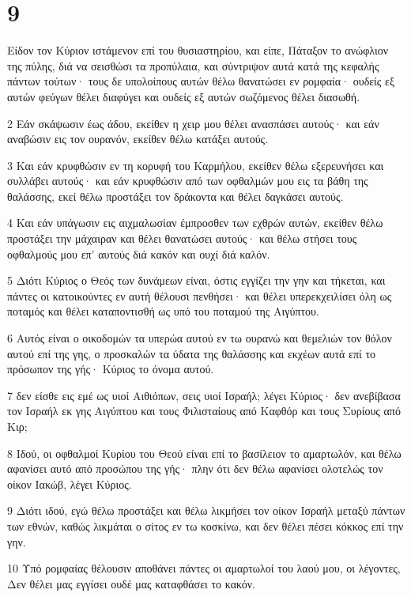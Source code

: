 \chapter{9}

\par Είδον τον Κύριον ιστάμενον επί του θυσιαστηρίου, και είπε, Πάταξον το ανώφλιον της πύλης, διά να σεισθώσι τα προπύλαια, και σύντριψον αυτά κατά της κεφαλής πάντων τούτων· τους δε υπολοίπους αυτών θέλω θανατώσει εν ρομφαία· ουδείς εξ αυτών φεύγων θέλει διαφύγει και ουδείς εξ αυτών σωζόμενος θέλει διασωθή.
\par 2 Εάν σκάψωσιν έως άδου, εκείθεν η χειρ μου θέλει ανασπάσει αυτούς· και εάν αναβώσιν εις τον ουρανόν, εκείθεν θέλω κατάξει αυτούς.
\par 3 Και εάν κρυφθώσιν εν τη κορυφή του Καρμήλου, εκείθεν θέλω εξερευνήσει και συλλάβει αυτούς· και εάν κρυφθώσιν από των οφθαλμών μου εις τα βάθη της θαλάσσης, εκεί θέλω προστάξει τον δράκοντα και θέλει δαγκάσει αυτούς.
\par 4 Και εάν υπάγωσιν εις αιχμαλωσίαν έμπροσθεν των εχθρών αυτών, εκείθεν θέλω προστάξει την μάχαιραν και θέλει θανατώσει αυτούς· και θέλω στήσει τους οφθαλμούς μου επ' αυτούς διά κακόν και ουχί διά καλόν.
\par 5 Διότι Κύριος ο Θεός των δυνάμεων είναι, όστις εγγίζει την γην και τήκεται, και πάντες οι κατοικούντες εν αυτή θέλουσι πενθήσει· και θέλει υπερεκχειλίσει όλη ως ποταμός και θέλει καταποντισθή ως υπό του ποταμού της Αιγύπτου.
\par 6 Αυτός είναι ο οικοδομών τα υπερώα αυτού εν τω ουρανώ και θεμελιών τον θόλον αυτού επί της γης, ο προσκαλών τα ύδατα της θαλάσσης και εκχέων αυτά επί το πρόσωπον της γής· Κύριος το όνομα αυτού.
\par 7 δεν είσθε εις εμέ ως υιοί Αιθιόπων, σεις υιοί Ισραήλ; λέγει Κύριος· δεν ανεβίβασα τον Ισραήλ εκ γης Αιγύπτου και τους Φιλισταίους από Καφθόρ και τους Συρίους από Κιρ;
\par 8 Ιδού, οι οφθαλμοί Κυρίου του Θεού είναι επί το βασίλειον το αμαρτωλόν, και θέλω αφανίσει αυτό από προσώπου της γής· πλην ότι δεν θέλω αφανίσει ολοτελώς τον οίκον Ιακώβ, λέγει Κύριος.
\par 9 Διότι ιδού, εγώ θέλω προστάξει και θέλω λικμήσει τον οίκον Ισραήλ μεταξύ πάντων των εθνών, καθώς λικμάται ο σίτος εν τω κοσκίνω, και δεν θέλει πέσει κόκκος επί την γην.
\par 10 Υπό ρομφαίας θέλουσιν αποθάνει πάντες οι αμαρτωλοί του λαού μου, οι λέγοντες, Δεν θέλει μας εγγίσει ουδέ μας καταφθάσει το κακόν.
